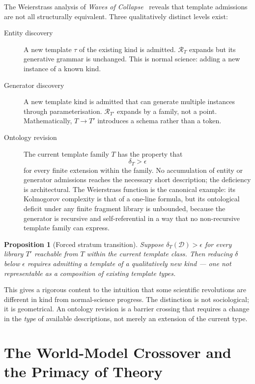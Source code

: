 \documentclass[11pt, a4paper, openany]{book}
\theoremstyle{plain}
\newtheorem{proposition}[theorem]{Proposition}
\theoremstyle{definition}
\theoremstyle{remark}
\begin{document}
The Weierstrass analysis of \emph{Waves of Collapse}~\cite{flyxion2026waves}
reveals that template admissions are not all structurally equivalent.
Three qualitatively distinct levels exist:

\begin{description}
  \item[Entity discovery]
    A new template $\tau$ of the existing kind is admitted.
    $\mathcal{R}_T$ expands but its generative grammar is unchanged.
    This is normal science: adding a new instance of a known kind.

  \item[Generator discovery]
    A new template kind is admitted that can generate multiple instances
    through parameterisation.
    $\mathcal{R}_{T'}$ expands by a family, not a point.
    Mathematically, $T \to T'$ introduces a schema rather than a token.

  \item[Ontology revision]
    The current template family $T$ has the property that
    \[
      \delta_T > \epsilon
    \]
    for every finite extension within the family.
    No accumulation of entity or generator admissions reaches the necessary
    short description; the deficiency is architectural.
    The Weierstrass function is the canonical example:
    its Kolmogorov complexity is that of a one-line formula,
    but its ontological deficit under any finite fragment library is unbounded,
    because the generator is recursive and self-referential in a way
    that no non-recursive template family can express.
\end{description}

\begin{proposition}[Forced stratum transition]
  Suppose $\delta_T(\mathcal{D}) > \epsilon$ for every library $T'$
  reachable from $T$ within the current template class.
  Then reducing $\delta$ below $\epsilon$ requires admitting a template of
  a qualitatively new kind --- one not representable as a composition of
  existing template types.
\end{proposition}

This gives a rigorous content to the intuition that some scientific revolutions
are different in kind from normal-science progress.
The distinction is not sociological; it is geometrical.
An ontology revision is a barrier crossing that requires a change in the
\emph{type} of available descriptions, not merely an extension of the
current type.

\section{The World-Model Crossover and the Primacy of Theory}
\end{document}
